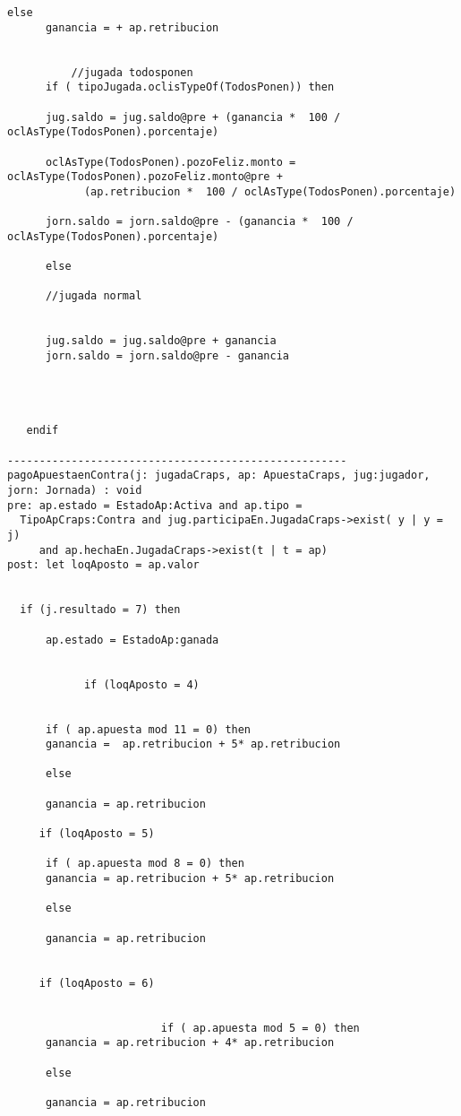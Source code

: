 \begin{framed}
\begin{lstlisting}[breaklines=true]
      else
      ganancia = + ap.retribucion 
    

          //jugada todosponen
      if ( tipoJugada.oclisTypeOf(TodosPonen)) then 
    
      jug.saldo = jug.saldo@pre + (ganancia *  100 / oclAsType(TodosPonen).porcentaje)
    
      oclAsType(TodosPonen).pozoFeliz.monto = oclAsType(TodosPonen).pozoFeliz.monto@pre + 
            (ap.retribucion *  100 / oclAsType(TodosPonen).porcentaje)

      jorn.saldo = jorn.saldo@pre - (ganancia *  100 / oclAsType(TodosPonen).porcentaje)

      else

      //jugada normal


      jug.saldo = jug.saldo@pre + ganancia
      jorn.saldo = jorn.saldo@pre - ganancia  
      
  


   endif

-----------------------------------------------------
pagoApuestaenContra(j: jugadaCraps, ap: ApuestaCraps, jug:jugador, jorn: Jornada) : void
pre: ap.estado = EstadoAp:Activa and ap.tipo = 
  TipoApCraps:Contra and jug.participaEn.JugadaCraps->exist( y | y = j) 
     and ap.hechaEn.JugadaCraps->exist(t | t = ap)
post: let loqAposto = ap.valor
  

  if (j.resultado = 7) then

      ap.estado = EstadoAp:ganada
      
  
            if (loqAposto = 4)

      
      if ( ap.apuesta mod 11 = 0) then
      ganancia =  ap.retribucion + 5* ap.retribucion
      
      else
      
      ganancia = ap.retribucion 
      
     if (loqAposto = 5)

      if ( ap.apuesta mod 8 = 0) then
      ganancia = ap.retribucion + 5* ap.retribucion
      
      else
      
      ganancia = ap.retribucion 
      

     if (loqAposto = 6)


                        if ( ap.apuesta mod 5 = 0) then
      ganancia = ap.retribucion + 4* ap.retribucion
      
      else
      
      ganancia = ap.retribucion 
      

\end{lstlisting}
\end{framed}
